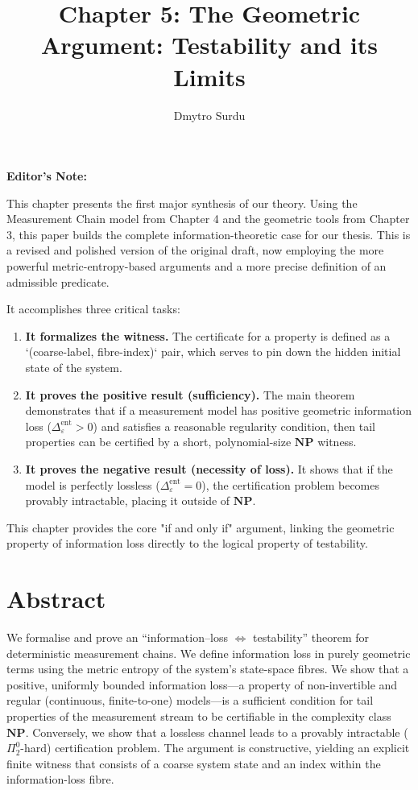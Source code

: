 \documentclass[12pt]{article}
\title{\textbf{Chapter 5: The Geometric Argument: Testability and its Limits}}
\author{Dmytro Surdu}
\date{}
\theoremstyle{definition}
\theoremstyle{plain}
\newenvironment{editorsnote}{%
  \begin{framed}
  \noindent\textbf{Editor's Note:}\em
}{\end{framed}}
\begin{document}
\maketitle

\begin{editorsnote}
This chapter presents the first major synthesis of our theory. Using the Measurement Chain model from Chapter 4 and the geometric tools from Chapter 3, this paper builds the complete information-theoretic case for our thesis. This is a revised and polished version of the original draft, now employing the more powerful metric-entropy-based arguments and a more precise definition of an admissible predicate.

It accomplishes three critical tasks:
\begin{enumerate}
    \item \textbf{It formalizes the witness.} The certificate for a property is defined as a `(coarse-label, fibre-index)` pair, which serves to pin down the hidden initial state of the system.
    \item \textbf{It proves the positive result (sufficiency).} The main theorem demonstrates that if a measurement model has positive geometric information loss ($\Delta^{\text{ent}}_\varepsilon > 0$) and satisfies a reasonable regularity condition, then tail properties can be certified by a short, polynomial-size $\mathbf{NP}$ witness.
    \item \textbf{It proves the negative result (necessity of loss).} It shows that if the model is perfectly lossless ($\Delta^{\text{ent}}_\varepsilon = 0$), the certification problem becomes provably intractable, placing it outside of $\mathbf{NP}$.
\end{enumerate}
This chapter provides the core "if and only if" argument, linking the geometric property of information loss directly to the logical property of testability.
\end{editorsnote}

\section*{Abstract}
We formalise and prove an ``information--loss $\Leftrightarrow$ testability'' theorem for deterministic measurement chains. We define information loss in purely geometric terms using the metric entropy of the system's state-space fibres. We show that a positive, uniformly bounded information loss—a property of non-invertible and regular (continuous, finite-to-one) models—is a sufficient condition for tail properties of the measurement stream to be certifiable in the complexity class $\mathbf{NP}$. Conversely, we show that a lossless channel leads to a provably intractable ($\Pi^0_2$-hard) certification problem. The argument is constructive, yielding an explicit finite witness that consists of a coarse system state and an index within the information-loss fibre.
\end{document}
